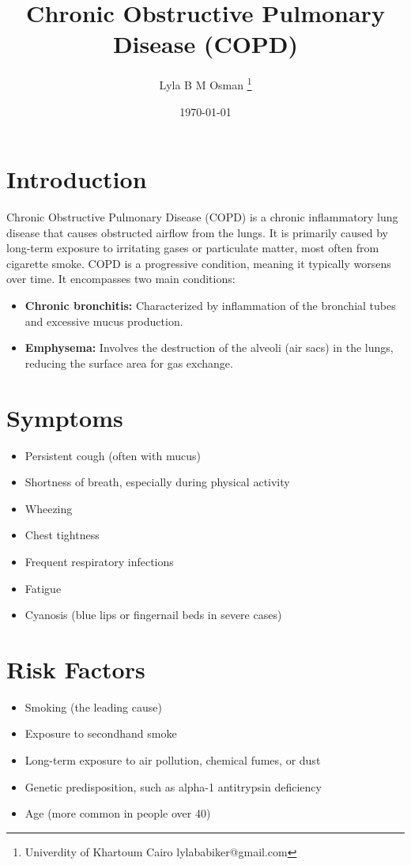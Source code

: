 \documentclass{article}
\title{\textbf{Chronic Obstructive Pulmonary Disease (COPD)}}
\author{Lyla B M Osman  \footnote {Univerdity of Khartoum  Cairo \email lylababiker@gmail.com }}
\date{\today}
\begin{document}
\maketitle

\section*{Introduction}
Chronic Obstructive Pulmonary Disease (COPD) is a chronic inflammatory lung disease that causes obstructed airflow from the lungs. It is primarily caused by long-term exposure to irritating gases or particulate matter, most often from cigarette smoke. COPD is a progressive condition, meaning it typically worsens over time. It encompasses two main conditions:
\begin{itemize}
    \item \textbf{Chronic bronchitis:} Characterized by inflammation of the bronchial tubes and excessive mucus production.
    \item \textbf{Emphysema:} Involves the destruction of the alveoli (air sacs) in the lungs, reducing the surface area for gas exchange.
\end{itemize}

\section*{Symptoms}
\begin{itemize}
    \item Persistent cough (often with mucus)
    \item Shortness of breath, especially during physical activity
    \item Wheezing
    \item Chest tightness
    \item Frequent respiratory infections
    \item Fatigue
    \item Cyanosis (blue lips or fingernail beds in severe cases)
\end{itemize}

\section*{Risk Factors}
\begin{itemize}
    \item Smoking (the leading cause)
    \item Exposure to secondhand smoke
    \item Long-term exposure to air pollution, chemical fumes, or dust
    \item Genetic predisposition, such as alpha-1 antitrypsin deficiency
    \item Age (more common in people over 40)
\end{itemize}
\end{document}

